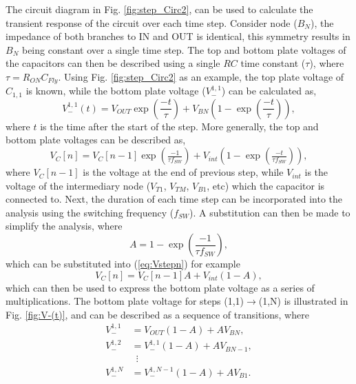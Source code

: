 \documentclass[conference]{IEEEtran}
\begin{document}
	The circuit diagram in Fig. \ref{fig:step_Circ2}, can be used to calculate the transient response of the circuit over each time step. Consider node ($B_N$),  the impedance of both branches to IN and OUT is identical, this symmetry results in $B_N$ being constant over a single time step. The top and bottom plate voltages of the capacitors can then be described using a single $RC$ time constant ($\tau$), where $\tau = R_{ON}C_{Fly}$. Using Fig. \ref{fig:step_Circ2} as an example, the top plate voltage of $C_{1,1}$ is known, while the bottom plate voltage ($V_{-}^{1,1}$) can be calculated as,
	\begin{equation}
	V_{-}^{1,1}(t) = V_{OUT}\exp\left(\frac{-t}{\tau}\right) + V_{BN}\left(1-\exp\left(\frac{-t}{\tau}\right)\right),
	\end{equation}
	where $t$ is the time after the start of the step. More generally, the top and bottom plate voltages can be described as,
	\begin{equation}
	V_{C}[n]\! =\! V_{C}[n\!-\!1]\exp\left(\tfrac{-1}{\tau f_{SW}}\right) + V_{int}\!\left(1-\exp\left(\tfrac{-t}{\tau f_{SW}}\right)\right),
	\label{eq:Vstepn}
	\end{equation}
	where $V_{C}[n-1]$ is the voltage at the end of previous step, while $V_{int}$ is the voltage of the intermediary node ($V_{T1}$, $V_{TM}$, $V_{B1}$, etc) which the capacitor is connected to. Next, the duration of each time step can be incorporated into the analysis using the switching frequency ($f_{SW}$). A substitution can then be made to simplify the analysis, where
	\begin{equation}
	A = 1-\exp\left(\frac{-1}{\tau f_{SW}}\right),
	\end{equation}
	which can be substituted into (\ref{eq:Vstepn}) for example
	\begin{equation}
		V_{C}[n] = V_C[n-1]A + V_{int}(1-A),
	\end{equation}
	which can then be used to express the bottom plate voltage as a series of multiplications. The bottom plate voltage for steps (1,1)$\rightarrow $(1,N) is illustrated in Fig. \ref{fig:V-(t)}, and can be described as a sequence of transitions, where
	\begin{equation}
	\begin{split}
	V_-^{1,1} &= V_{OUT}(1-A) + AV_{BN},\\
	V_-^{1,2} &= V_-^{1,1}(1-A) + AV_{BN-1},\\
	& \,\,\,\vdots\\
	V_{-}^{1,N} &= V_-^{1,N-1}(1-A) + AV_{B1}.
	\end{split}		
	\end{equation}
\end{document}
